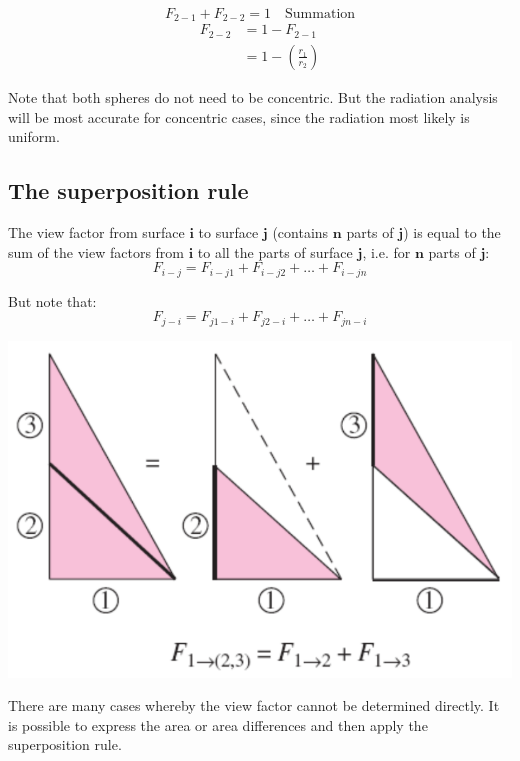 \documentclass[11pt]{article}
\begin{document}
\[F_{2-1} + F_{2-2} = 1 \quad \text{Summation}\]
\begin{align*}
F_{2-2} &= 1 - F_{2-1} \\
&= 1 - \left(\frac{r_1}{r_2} \right)
\end{align*}

Note that both spheres do not need to be concentric. But the radiation analysis will be most accurate for concentric cases, since the radiation most likely is uniform.

\subsection{The superposition rule}
\label{sec:org5b6f25e}
The view factor from surface \(\boldsymbol{i}\) to surface \(\boldsymbol{j}\) (contains \(\boldsymbol{n}\) parts of \(\boldsymbol{j}\)) is equal to the sum of the view factors from \(\boldsymbol{i}\) to all the parts of surface \(\boldsymbol{j}\), i.e. for \(\boldsymbol{n}\) parts of \(\boldsymbol{j}\):
\[F_{i-j} = F_{i-j1} + F_{i-j2} + \ldots + F_{i-jn}\]

But note that:
\[F_{j-i} = F_{j1-i} + F_{j2-i} + \ldots + F_{jn-i}\]

\begin{center}
\includegraphics[width=.9\linewidth]{./images/superposition-rule-diagram.png}
\end{center}

There are many cases whereby the view factor cannot be determined directly. It is possible to express the area or area differences and then apply the superposition rule.
\end{document}
